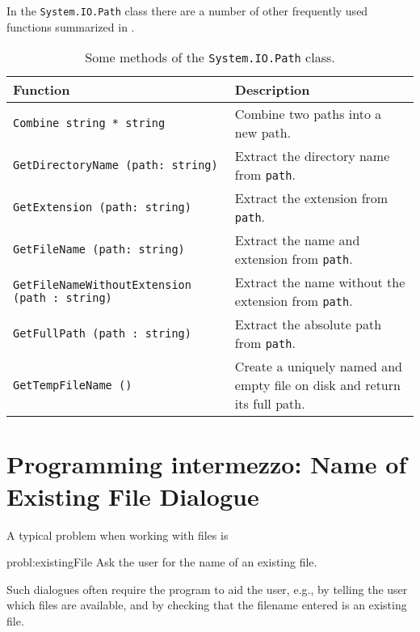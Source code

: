 \documentclass[fsharpNotes.tex]{subfiles}
\begin{document}
In the \lstinline!System.IO.Path! class there are a number of other frequently used functions summarized in .%
%
%
%
%
%
%
%
\begin{table}
  \begin{center}
    \begin{tabularx}{\linewidth}{|l|X|}
      \hline
      \rowcolor{headerRowColor}  Function & Description\\
      \hline
      \lstinline{Combine string * string} & Combine two paths into a new path.\\
      \hline
      \lstinline{GetDirectoryName (path: string)} & Extract the directory name from \lstinline{path}.\\
      \hline
      \lstinline{GetExtension (path: string)} & Extract the extension from \lstinline{path}.\\
      \hline
      \lstinline{GetFileName (path: string)} & Extract the name and extension from \lstinline{path}.\\
      \hline
      \lstinline{GetFileNameWithoutExtension (path : string)} & Extract the name without the extension from \lstinline{path}.\\
      \hline
      \lstinline{GetFullPath (path : string)} & Extract the absolute path from \lstinline{path}.\\
      \hline
      \lstinline{GetTempFileName ()} & Create a uniquely named and empty file on disk and return its full path.\\
      \hline
    \end{tabularx}
  \end{center}
  \caption{Some methods of the \lstinline!System.IO.Path! class.}
  \label{tab:path}
\end{table}

\section{Programming intermezzo: Name of Existing File Dialogue}
A typical problem when working with files is
\begin{task}{probl:existingFile}
  Ask the user for the name of an existing file.
\end{task}
Such dialogues often require the program to aid the user, e.g., by telling the user which files are available, and by checking that the filename entered is an existing file.
\end{document}
